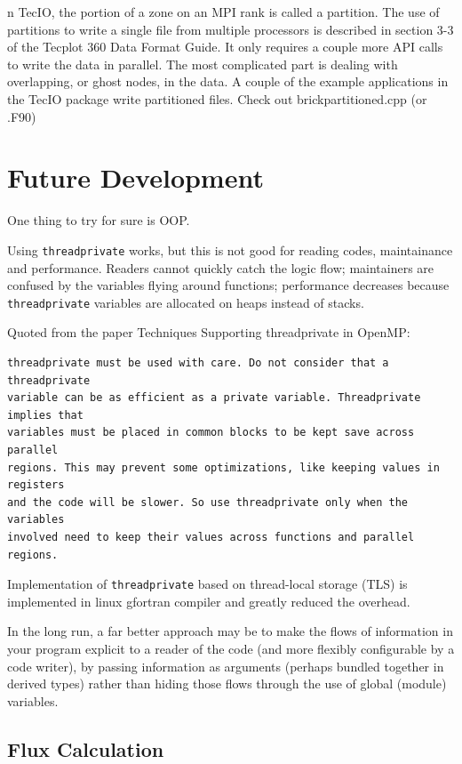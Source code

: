 \documentclass[11pt]{book} %
\begin{document}
n TecIO, the portion of a zone on an MPI rank is called a partition. The use of partitions to write a single file from multiple processors is described in section 3-3 of the Tecplot 360 Data Format Guide. It only requires a couple more API calls to write the data in parallel. The most complicated part is dealing with overlapping, or ghost nodes, in the data. A couple of the example applications in the TecIO package write partitioned files. Check out brickpartitioned.cpp (or .F90)

\section{Future Development}

One thing to try for sure is OOP.

Using \verb|threadprivate| works, but this is not good for reading codes, maintainance and performance.
Readers cannot quickly catch the logic flow; maintainers are confused by the variables flying around functions; performance decreases because \verb|threadprivate| variables are allocated on heaps instead of stacks.

Quoted from the paper Techniques Supporting threadprivate in OpenMP:
\begin{verbatim}
threadprivate must be used with care. Do not consider that a threadprivate
variable can be as efficient as a private variable. Threadprivate implies that 
variables must be placed in common blocks to be kept save across parallel
regions. This may prevent some optimizations, like keeping values in registers
and the code will be slower. So use threadprivate only when the variables 
involved need to keep their values across functions and parallel regions.
\end{verbatim}

Implementation of \verb|threadprivate| based on thread-local storage (TLS) is implemented in linux gfortran compiler and greatly reduced the overhead.

In the long run, a far better approach may be to make the flows of information in your program explicit to a reader of the code (and more flexibly configurable by a code writer), by passing information as arguments (perhaps bundled together in derived types) rather than hiding those flows through the use of global (module) variables.

\subsection{Flux Calculation}
\end{document}
